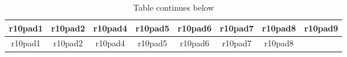 \documentclass[]{book}
\begin{document}
\begin{longtable}[]{@{}cccccccc@{}}
\caption{Table continues below}\tabularnewline
\toprule
\begin{minipage}[b]{0.10\columnwidth}\centering\strut
r10pad1\strut
\end{minipage} & \begin{minipage}[b]{0.10\columnwidth}\centering\strut
r10pad2\strut
\end{minipage} & \begin{minipage}[b]{0.10\columnwidth}\centering\strut
r10pad4\strut
\end{minipage} & \begin{minipage}[b]{0.10\columnwidth}\centering\strut
r10pad5\strut
\end{minipage} & \begin{minipage}[b]{0.10\columnwidth}\centering\strut
r10pad6\strut
\end{minipage} & \begin{minipage}[b]{0.10\columnwidth}\centering\strut
r10pad7\strut
\end{minipage} & \begin{minipage}[b]{0.10\columnwidth}\centering\strut
r10pad8\strut
\end{minipage} & \begin{minipage}[b]{0.10\columnwidth}\centering\strut
r10pad9\strut
\end{minipage}\tabularnewline
\midrule
\endfirsthead
\toprule
\begin{minipage}[b]{0.10\columnwidth}\centering\strut
r10pad1\strut
\end{minipage} & \begin{minipage}[b]{0.10\columnwidth}\centering\strut
r10pad2\strut
\end{minipage} & \begin{minipage}[b]{0.10\columnwidth}\centering\strut
r10pad4\strut
\end{minipage} & \begin{minipage}[b]{0.10\columnwidth}\centering\strut
r10pad5\strut
\end{minipage} & \begin{minipage}[b]{0.10\columnwidth}\centering\strut
r10pad6\strut
\end{minipage} & \begin{minipage}[b]{0.10\columnwidth}\centering\strut
r10pad7\strut
\end{minipage} & \begin{minipage}[b]{0.10\columnwidth}\centering\strut
r10pad8\strut
\end{minipage} & \begin{minipage}[b]{0.10\columnwidth}\centering\strut

\end{minipage}
\end{longtable}
\end{document}
